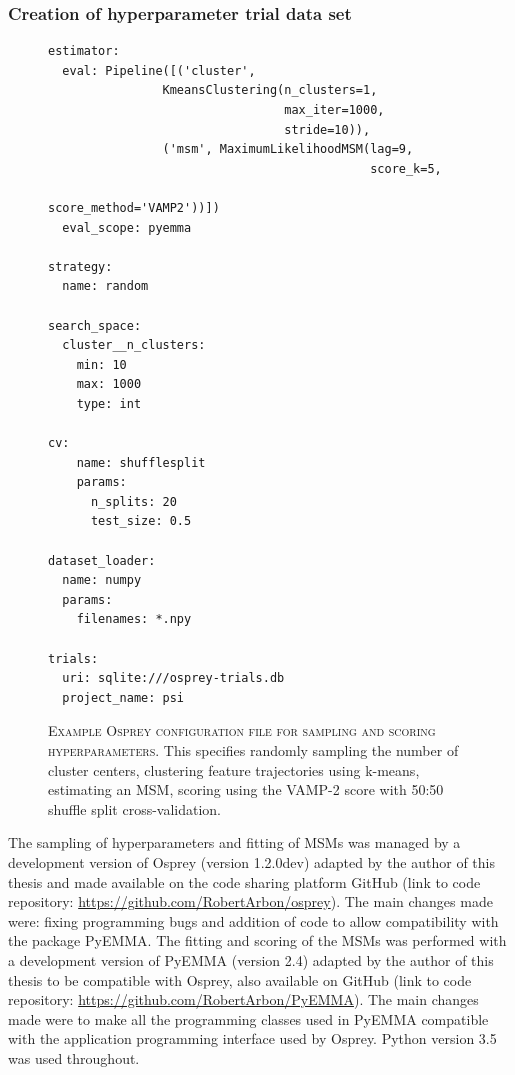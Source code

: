 \subsubsection*{Creation of hyperparameter trial data set} 

\begin{figure}
    \centering
    \begin{lstlisting}
estimator:
  eval: Pipeline([('cluster', 
                KmeansClustering(n_clusters=1, 
                                 max_iter=1000, 
                                 stride=10)),
                ('msm', MaximumLikelihoodMSM(lag=9, 
                                             score_k=5, 
                                             score_method='VAMP2'))])
  eval_scope: pyemma

strategy:
  name: random

search_space:
  cluster__n_clusters:
    min: 10
    max: 1000
    type: int

cv:
    name: shufflesplit
    params:
      n_splits: 20
      test_size: 0.5

dataset_loader:
  name: numpy
  params:
    filenames: *.npy

trials:
  uri: sqlite:///osprey-trials.db
  project_name: psi
    \end{lstlisting}
    \caption[Example Osprey configuration file for sampling and scoring hyperparameters]{\textsc{Example Osprey configuration file for sampling and scoring hyperparameters}. This specifies randomly sampling the number of cluster centers, clustering feature trajectories using k-means, estimating an MSM, scoring using the VAMP-2 score with 50:50 shuffle split cross-validation.}\label{fig:osprey_config}
\end{figure}

The sampling of hyperparameters and fitting of MSMs was managed by a development version of Osprey (version 1.2.0dev) \cite{mcgibbonOspreyHyperparameterOptimization2016} adapted by the author of this thesis and made available on the code sharing platform GitHub (link to code repository: \href{https://github.com/RobertArbon/osprey/tree/1a108009e560b6d5e989bb2bd1555ec62e6795d0}{\color{blue}https://github.com/RobertArbon/osprey}). The main changes made were: fixing programming bugs and addition of code to allow compatibility with the package PyEMMA.  The fitting and scoring of the MSMs was performed with a development version of PyEMMA (version 2.4) \cite{schererPyEMMASoftwarePackage2015a} adapted by the author of this thesis to be compatible with Osprey, also available on GitHub (link to code repository: \href{https://github.com/RobertArbon/PyEMMA/tree/39bcb0f7b43f4424072e3e67fdff1b12cb62c99d}{\color{blue}https://github.com/RobertArbon/PyEMMA}). The main changes made were to make all the programming classes used in PyEMMA compatible with the application programming interface used by Osprey. Python version 3.5 was used throughout. 

